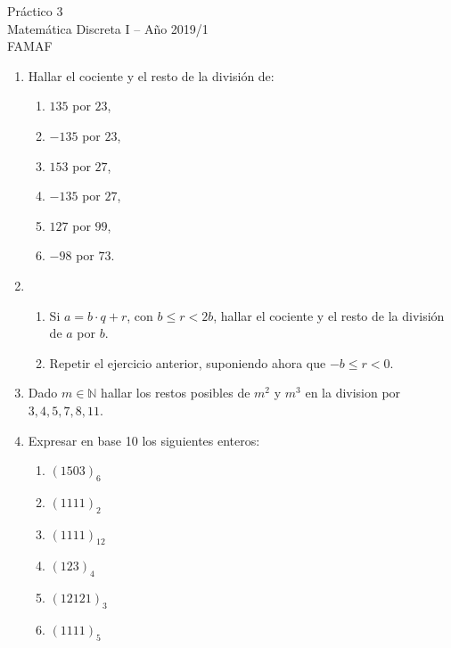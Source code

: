 \documentclass[12pt,spanish,makeidx]{amsbook}
\begin{document}
{\bf \begin{center} Práctico 3 \\ Matemática Discreta I -- Año 2019/1 \\ FAMAF \end{center}}

\smallskip


\begin{enumerate}


\smallskip

\item Hallar el cociente y el resto de la divisi\'on de:

\begin{multicols}{3}
\begin{enumerate}
  \item $135$ por $23$,
	\item $-135$ por $23$,
	\item $153$ por $27$,
  \item $-135$ por $27$,
	\item $127$ por $99$,
	\item $-98$ por $73$.
\end{enumerate}
\end{multicols}

\smallskip

\item 
\begin{enumerate}
  \item Si $a=b\cdot q+r$, con $b \le r <2 b$, hallar el cociente y el resto de la divisi\'on de $a$ por $b$.
  \item Repetir el ejercicio anterior, suponiendo ahora que $-b \le r < 0$.
\end{enumerate}


\smallskip
\item Dado $m\in \mathbb N$ hallar los restos posibles de $m^2$ y $m^3$ en la division por $3,4,5,7,8, 11$.

\smallskip
\item Expresar en base 10 los siguientes enteros:
\begin{multicols}{3}
\begin{enumerate}
	\item $(1503)_6$ 
	\item $(1111)_2$ 
	\item $(1111)_{12}$
	\item $(123)_4$ 
	\item $(12121)_3$
	\item $(1111)_5$
\end{enumerate}
\end{multicols}


\end{enumerate}
\end{document}
